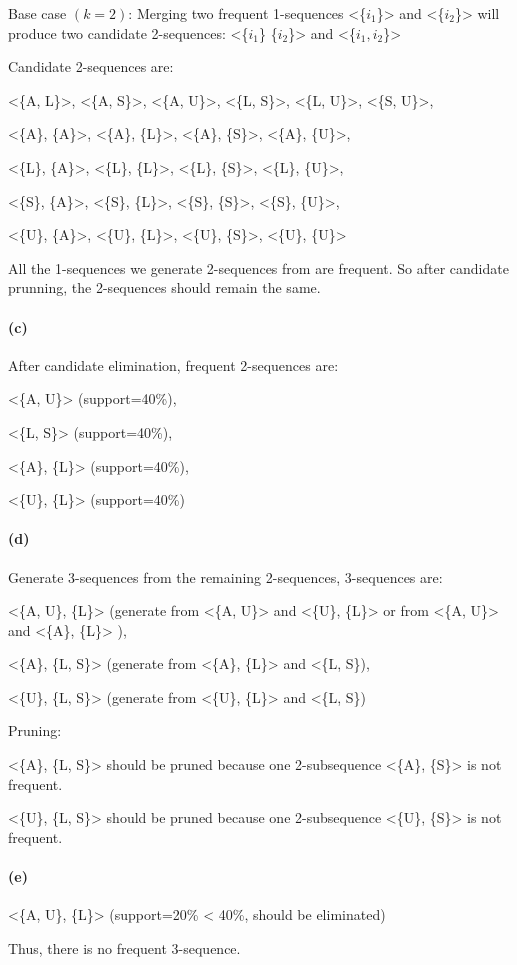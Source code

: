 \documentclass[en,black,normal,10pt]{elegantnote}
\begin{document}
Base case $(k=2)$: Merging two frequent 1-sequences <\{$i_1$\}> and <\{$i_2$\}> will produce two candidate 2-sequences: <\{$i_1$\} \{$i_2$\}> and <\{$i_1 , i_2$\}>

Candidate 2-sequences are:

<\{A, L\}>, <\{A, S\}>, <\{A, U\}>, <\{L, S\}>, <\{L, U\}>, <\{S, U\}>,

<\{A\}, \{A\}>, <\{A\}, \{L\}>, <\{A\}, \{S\}>, <\{A\}, \{U\}>, 

<\{L\}, \{A\}>, <\{L\}, \{L\}>, <\{L\}, \{S\}>, <\{L\}, \{U\}>, 

<\{S\}, \{A\}>, <\{S\}, \{L\}>, <\{S\}, \{S\}>, <\{S\}, \{U\}>, 

<\{U\}, \{A\}>, <\{U\}, \{L\}>, <\{U\}, \{S\}>, <\{U\}, \{U\}>

All the 1-sequences we generate 2-sequences from are frequent. So after candidate prunning, the 2-sequences should remain the same.

\paragraph*{(c)}

After candidate elimination, frequent 2-sequences are:

<\{A, U\}> (support=40\%),

<\{L, S\}> (support=40\%),

<\{A\}, \{L\}> (support=40\%),

<\{U\}, \{L\}> (support=40\%)

\paragraph*{(d)}

Generate 3-sequences from the remaining 2-sequences, 3-sequences are:

<\{A, U\}, \{L\}> (generate from <\{A, U\}> and <\{U\}, \{L\}> or from <\{A, U\}> and <\{A\}, \{L\}> ),

<\{A\}, \{L, S\}> (generate from <\{A\}, \{L\}> and <\{L, S\}),

<\{U\}, \{L, S\}> (generate from <\{U\}, \{L\}> and <\{L, S\})

Pruning:

<\{A\}, \{L, S\}> should be pruned because one 2-subsequence <\{A\}, \{S\}> is not frequent.

<\{U\}, \{L, S\}> should be pruned because one 2-subsequence <\{U\}, \{S\}> is not frequent.

\paragraph*{(e)}

<\{A, U\}, \{L\}> (support=20\% < 40\%, should be eliminated)

Thus, there is no frequent 3-sequence.
\end{document}
